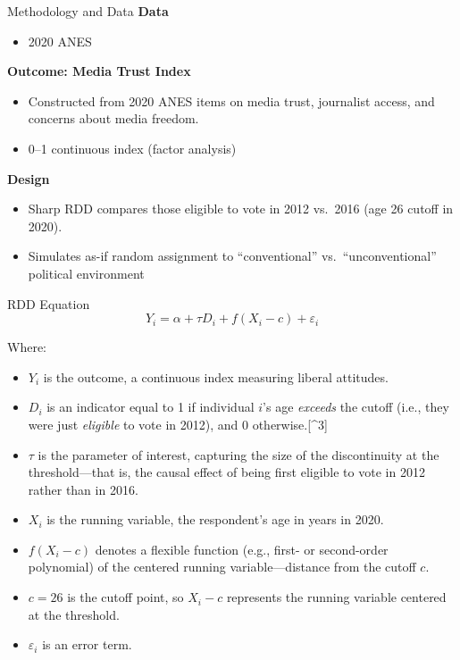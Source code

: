 \documentclass[
  ignorenonframetext,
]{beamer}
\providecommand{\tightlist}{%
  \setlength{\itemsep}{0pt}\setlength{\parskip}{0pt}}
\begin{document}
\begin{frame}{Methodology and Data}
\label{methodology-and-data}
\textbf{Data}

\begin{itemize}
\tightlist
\item
  2020 ANES
\end{itemize}

\textbf{Outcome: Media Trust Index}

\begin{itemize}
\item
  Constructed from 2020 ANES items on media trust, journalist access,
  and concerns about media freedom.
\item
  0--1 continuous index (factor analysis)
\end{itemize}

\textbf{Design}

\begin{itemize}
\item
  Sharp RDD compares those eligible to vote in 2012 vs.~2016 (age 26
  cutoff in 2020).
\item
  Simulates as-if random assignment to ``conventional''
  vs.~``unconventional'' political environment
\end{itemize}
\end{frame}

\begin{frame}{RDD Equation}
\label{rdd-equation}
\[
Y_i = \alpha + \tau D_i + f(X_i - c) + \varepsilon_i
\]

\small

Where:

\begin{itemize}
\tightlist
\item
  \(Y_i\) is the outcome, a continuous index measuring liberal
  attitudes.
\item
  \(D_i\) is an indicator equal to 1 if individual \(i\)'s age
  \emph{exceeds} the cutoff (i.e., they were just \emph{eligible} to
  vote in 2012), and 0 otherwise.{[}\^{}3{]}
\item
  \(\tau\) is the parameter of interest, capturing the size of the
  discontinuity at the threshold---that is, the causal effect of being
  first eligible to vote in 2012 rather than in 2016.
\item
  \(X_i\) is the running variable, the respondent's age in years in
  2020.
\item
  \(f(X_i - c)\) denotes a flexible function (e.g., first- or
  second-order polynomial) of the centered running variable---distance
  from the cutoff \(c\).
\item
  \(c = 26\) is the cutoff point, so \(X_i - c\) represents the running
  variable centered at the threshold.
\item
  \(\varepsilon_i\) is an error term.
\end{itemize}

\normalsize
\end{frame}
\end{document}
